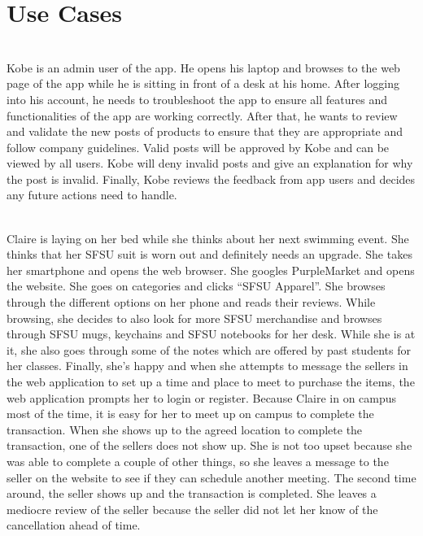\section{Use Cases}
\begin{description}[font=\bfseries\itshape]
\item[Use Case 1: Administrative Functions (Kobe)]\hfill\\
Kobe is an admin user of the app. He opens his laptop and browses to the web page of the app while he is sitting in front of a desk at his home. After logging into his account, he needs to troubleshoot the app to ensure all features and functionalities of the app are working correctly. After that, he wants to review and validate the new posts of products to ensure that they are appropriate and follow company guidelines. Valid posts will be approved by Kobe and can be viewed by all users. Kobe will deny invalid posts and give an explanation for why the post is invalid. Finally, Kobe reviews the feedback from app users and decides any future actions need to handle.

\item[Use Case 2: Purchase SFSU Apparel (Claire)]\hfill\\
Claire is laying on her bed while she thinks about her next swimming event. She thinks that her SFSU suit is worn out and definitely needs an upgrade. She takes her smartphone and opens the web browser. She googles PurpleMarket and opens the website. She goes on categories and clicks “SFSU Apparel”. She browses through the different options on her phone and reads their reviews. While browsing, she decides to also look for more SFSU merchandise and browses through SFSU mugs, keychains and SFSU notebooks for her desk. While she is at it, she also goes through some of the notes which are offered by past students for her classes. Finally, she’s happy and when she attempts to message the sellers in the web application to set up a time and place to meet to purchase the items, the web application prompts her to login or register.  Because Claire in on campus most of the time, it is easy for her to meet up on campus to complete the transaction.  When she shows up to the agreed location to complete the transaction, one of the sellers does not show up.  She is not too upset because she was able to complete a couple of other things, so she leaves a message to the seller on the website to see if they can schedule another meeting.  The second time around, the seller shows up and the transaction is completed.  She leaves a mediocre review of the seller because the seller did not let her know of the cancellation ahead of time.


\end{description}
